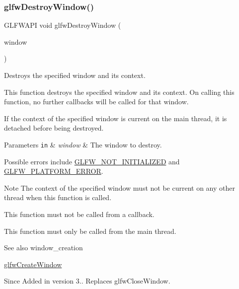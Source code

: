 \subsubsection{\texorpdfstring{glfw\+Destroy\+Window()}{glfwDestroyWindow()}}
{\footnotesize\ttfamily G\+L\+F\+W\+A\+PI void glfw\+Destroy\+Window (\begin{DoxyParamCaption}\item[{\hyperlink{group__window_ga3c96d80d363e67d13a41b5d1821f3242}{G\+L\+F\+Wwindow} $\ast$}]{window }\end{DoxyParamCaption})}



Destroys the specified window and its context. 

This function destroys the specified window and its context. On calling this function, no further callbacks will be called for that window.

If the context of the specified window is current on the main thread, it is detached before being destroyed.


\begin{DoxyParams}[1]{Parameters}
\mbox{\tt in}  & {\em window} & The window to destroy.\\
\hline
\end{DoxyParams}
Possible errors include \hyperlink{group__errors_ga2374ee02c177f12e1fa76ff3ed15e14a}{G\+L\+F\+W\+\_\+\+N\+O\+T\+\_\+\+I\+N\+I\+T\+I\+A\+L\+I\+Z\+ED} and \hyperlink{group__errors_gad44162d78100ea5e87cdd38426b8c7a1}{G\+L\+F\+W\+\_\+\+P\+L\+A\+T\+F\+O\+R\+M\+\_\+\+E\+R\+R\+OR}.

\begin{DoxyNote}{Note}
The context of the specified window must not be current on any other thread when this function is called.
\end{DoxyNote}
This function must not be called from a callback.

This function must only be called from the main thread.

\begin{DoxySeeAlso}{See also}
window\+\_\+creation 

\hyperlink{group__window_gaaccd00fafe81e2db94e8cdf55721e055}{glfw\+Create\+Window}
\end{DoxySeeAlso}
\begin{DoxySince}{Since}
Added in version 3.. Replaces {\ttfamily glfw\+Close\+Window}. 
\end{DoxySince}
\mbox{\label{group__window_ga0da0e3daaa2d100f44a115c09077b510}} 
